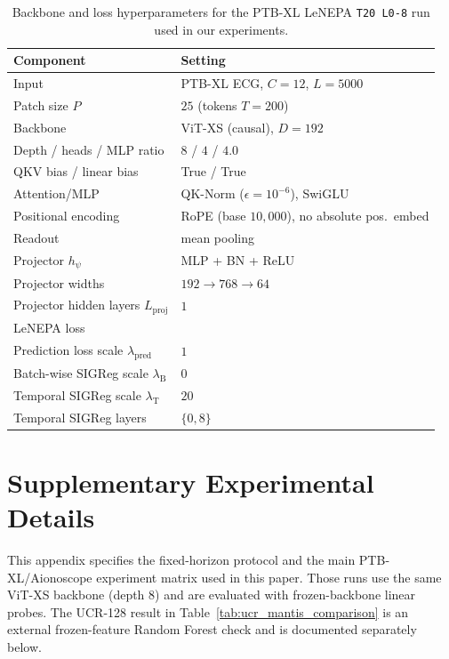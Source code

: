 \begin{table}[t]
\centering
\small
\begin{tabular}{@{}ll@{}}
\toprule
Component & Setting \\
\midrule
Input & PTB-XL ECG, $C{=}12$, $L{=}5000$ \\
Patch size $P$ & $25$ (tokens $T{=}200$) \\
Backbone & ViT-XS (causal), $D{=}192$ \\
Depth / heads / MLP ratio & $8$ / $4$ / $4.0$ \\
QKV bias / linear bias & True / True \\
Attention/MLP & QK-Norm ($\epsilon{=}10^{-6}$), SwiGLU \\
Positional encoding & RoPE (base $10{,}000$), no absolute pos.\ embed \\
Readout & mean pooling \\
Projector $h_{\psi}$ & MLP + BN + ReLU \\
Projector widths & $192 \rightarrow 768 \rightarrow 64$ \\
Projector hidden layers $L_{\text{proj}}$ & $1$ \\
\addlinespace
LeNEPA loss \\
Prediction loss scale $\lambda_{\text{pred}}$ & $1$ \\
Batch-wise SIGReg scale $\lambda_{\text{B}}$ & $0$ \\
Temporal SIGReg scale $\lambda_{\text{T}}$ & $20$ \\
Temporal SIGReg layers & $\{0,8\}$ \\
\bottomrule
\end{tabular}
\caption{Backbone and loss hyperparameters for the PTB-XL LeNEPA \texttt{T20 L0-8} run used in our experiments.}
\label{tab:ptbxl_lenepa_params}
\end{table}

\section{Supplementary Experimental Details}
\label{sec:appendix_experiments}

This appendix specifies the fixed-horizon protocol and the main PTB-XL/Aionoscope experiment matrix used in this paper.
Those runs use the same ViT-XS backbone (depth $8$) and are evaluated with frozen-backbone linear probes.
The UCR-128 result in Table~\ref{tab:ucr_mantis_comparison} is an external frozen-feature Random Forest check and is documented separately below.

